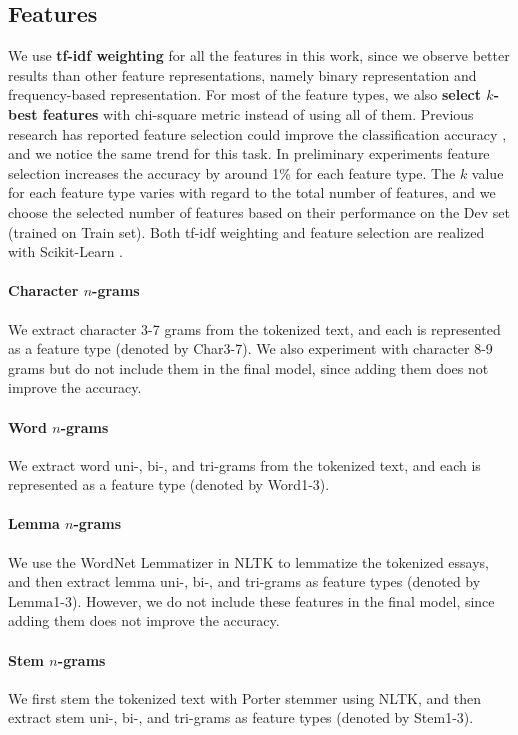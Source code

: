\documentclass[11pt,letterpaper]{article}
\begin{document}
\subsection{Features}
We use \textbf{tf-idf weighting} for all the features in this work, since we observe better results than other feature representations, namely binary representation and frequency-based representation. For most of the feature types, we also \textbf{select $k$-best features} with chi-square metric instead of using all of them. Previous research has reported feature selection could improve the classification accuracy \cite{liu2014}, and we notice the same trend for this task. In preliminary experiments feature selection increases the accuracy by around 1\% for each feature type. The $k$ value for each feature type varies with regard to the total number of features, and we choose the selected number of features based on their performance on the Dev set (trained on Train set). Both tf-idf weighting and feature selection are realized with Scikit-Learn \cite{sklearn}.

\paragraph{Character $n$-grams}
We extract character 3-7 grams from the tokenized text, and each is represented as a feature type (denoted by Char3-7). We also experiment with character 8-9 grams but do not include them in the final model, since adding them does not improve the accuracy.

\paragraph{Word $n$-grams}
We extract word uni-, bi-, and tri-grams from the tokenized text, and each is represented as a feature type (denoted by Word1-3).

\paragraph{Lemma $n$-grams}
We use the WordNet Lemmatizer in NLTK \cite{nltk} to lemmatize the tokenized essays, and then extract lemma uni-, bi-, and tri-grams as feature types (denoted by Lemma1-3). However, we do not include these features in the final model, since adding them does not improve the accuracy.

\paragraph{Stem $n$-grams}
We first stem the tokenized text with Porter stemmer using NLTK, and then extract stem uni-, bi-, and tri-grams as feature types (denoted by Stem1-3).
\end{document}
